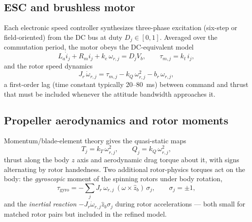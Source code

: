 \documentclass[conference]{IEEEtran}
\begin{document}
\subsection{ESC and brushless motor}
Each electronic speed controller synthesizes three-phase excitation (six-step or field-oriented) from the DC bus at duty $D_j\in[0,1]$. Averaged over the commutation period, the motor obeys the DC-equivalent model
\begin{equation}
L_a\dot i_j + R_m i_j + k_e\,\omega_{r,j} = D_j V_b,\qquad
\tau_{m,j} = k_t\, i_j ,
\end{equation}
and the rotor speed dynamics
\begin{equation}
J_r\,\dot\omega_{r,j} = \tau_{m,j} - k_Q\,\omega_{r,j}^2 - b_r\,\omega_{r,j},
\label{eq:rotorspeed}
\end{equation}
a first-order lag (time constant typically 20--80~ms) between command and thrust that must be included whenever the attitude bandwidth approaches it.

\subsection{Propeller aerodynamics and rotor moments}
Momentum/blade-element theory gives the quasi-static maps
\begin{equation}
T_j = k_T\,\omega_{r,j}^2,\qquad Q_j = k_Q\,\omega_{r,j}^2,
\end{equation}
thrust along the body $z$ axis and aerodynamic drag torque about it, with signs alternating by rotor handedness. Two additional rotor-physics torques act on the body: the \emph{gyroscopic} moment of the spinning rotors under body rotation,
\begin{equation}
\tau_{\mathrm{gyro}} = -\sum_j J_r\,\omega_{r,j}\ (\omega \times \hat z_b)\,\sigma_j,
\qquad \sigma_j = \pm1,
\end{equation}
and the \emph{inertial reaction} $-J_r\dot\omega_{r,j}\hat z_b\sigma_j$ during rotor accelerations --- both small for matched rotor pairs but included in the refined model.
\end{document}
